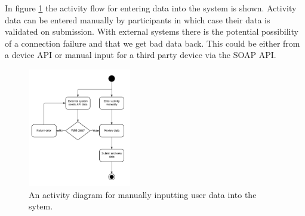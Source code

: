 In figure \ref{fig:activity-diagram-manual-api-data-input} the activity flow for entering data into the system is shown. Activity data can be entered manually by participants in which case their data is validated on submission. With external systems there is the potential possibility of a connection failure and that we get bad data back. This could be either from a device API or manual input for a third party device via the SOAP API. 

\begin{figure}[H]
\centering
\includegraphics[width=0.4\textwidth]{../design/UML/StateActivity/Manual-API-Data-Input.png}
\caption{An activity diagram for manually inputting user data into the sytem.}
\label{fig:activity-diagram-manual-api-data-input}
\end{figure}




